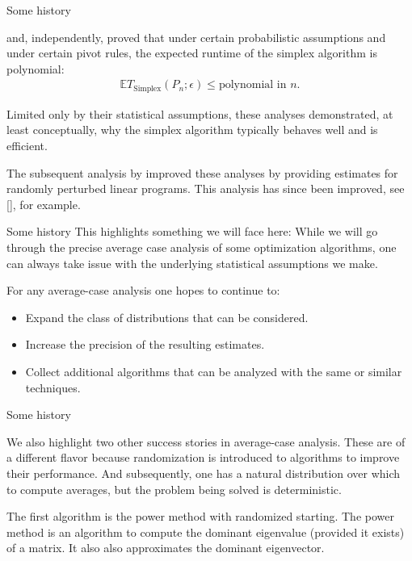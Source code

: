 \documentclass[9pt,aspectratio=169]{beamer}
\begin{document}
 \begin{frame}{Some history}

\cite{Borgwardt1987} and, independently, \cite{Smale1983} proved that under certain probabilistic assumptions and under certain pivot rules, the expected runtime of the simplex algorithm is polynomial:
  \begin{align*}
      \mathbb E T_{\mathrm{Simplex}} ( P_n; \epsilon) \leq \text{polynomial in } n.
  \end{align*}

 \vspace{.1in}\pause

 Limited only by their statistical assumptions, these analyses demonstrated, at least conceptually, why the simplex algorithm typically behaves well and is efficient.  

 \vspace{.1in}\pause

 The subsequent analysis by \citet{Spielman2004} improved these analyses by providing estimates for randomly perturbed linear programs.  This analysis has since been improved, see [\cite{Dadush2020,Vershynin2009a,Deshpande}], for example.

 \end{frame}

\begin{frame}{Some history}
 This highlights something we will face here:  While we will go through the precise average case analysis of some optimization algorithms, one can always take issue with the underlying statistical assumptions we make.


\pause

For any average-case analysis one hopes to continue to:
\begin{itemize}
    \item Expand the class of distributions that can be considered.
    \item Increase the precision of the resulting estimates.
    \item Collect additional algorithms that can be analyzed with the same or similar techniques.
\end{itemize}

\end{frame}




\begin{frame}{Some history}

We also highlight two other success stories in average-case analysis.  These are of a different flavor because randomization is introduced to algorithms to improve their performance.  And subsequently, one has a natural distribution over which to compute averages, but the problem being solved is deterministic.

\vspace{.1in}\pause

The first algorithm is the power method with randomized starting.  The power method is an algorithm to compute the dominant eigenvalue (provided it exists) of a matrix.  It also also approximates the dominant eigenvector.  

\end{frame}
\end{document}
